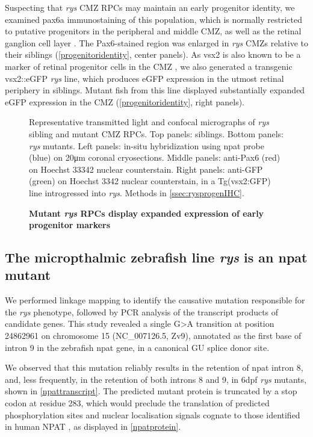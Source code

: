 Suspecting that \textit{rys} CMZ RPCs may maintain an early progenitor identity, we examined pax6a immunostaining of this population, which is normally restricted to putative progenitors in the peripheral and middle CMZ, as well as the retinal ganglion cell layer \cite{Raymond2006}. The Pax6-stained region was enlarged in \textit{rys} CMZs relative to their siblings (\autoref{progenitoridentity}, center panels). As vsx2 is also known to be a marker of retinal progenitor cells in the CMZ \cite{Raymond2006}, we also generated a transgenic vsx2::eGFP \textit{rys} line, which produces eGFP expression in the utmost retinal periphery in siblings. Mutant fish from this line displayed substantially expanded eGFP expression in the CMZ (\autoref{progenitoridentity}, right panels).

\begin{figure}[!h]
    \caption{{\bf Mutant \textit{rys} RPCs display expanded expression of early progenitor markers}}
    Representative transmitted light and confocal micrographs of \textit{rys} sibling and mutant CMZ RPCs. Top panels: siblings. Bottom panels: \textit{rys} mutants. Left panels: in-situ hybridization using npat probe (blue) on 20\si{\micro\metre} coronal cryosections. Middle panels: anti-Pax6 (red) on Hoechst 33342 nuclear counterstain. Right panels: anti-GFP (green) on Hoechst 3342 nuclear counterstain, in a Tg(vsx2:GFP) line introgressed into \textit{rys}. 
    Methods in \autoref{ssec:rysprogenIHC}.
    \label{progenitoridentity}
\end{figure}

\FloatBarrier
\subsection{The micropthalmic zebrafish line \textit{rys} is an npat mutant}

We performed linkage mapping to identify the causative mutation responsible for the \textit{rys} phenotype, followed by PCR analysis of the transcript products of candidate genes. This study revealed a single G\textgreater{}A transition at position 24862961 on chromosome 15 (NC\_007126.5, Zv9), annotated as the first base of intron 9 in the zebrafish npat gene, in a canonical GU splice donor site. 

We observed that this mutation reliably results in the retention of npat intron 8, and, less frequently, in the retention of both introns 8 and 9, in 6dpf \textit{rys} mutants, shown in \autoref{npattranscript}. The predicted mutant protein is truncated by a stop codon at residue 283, which would preclude the translation of predicted phosphorylation sites and nuclear localisation signals cognate to those identified in human NPAT \cite{Ma2000,Sagara2002}, as displayed in \autoref{npatprotein}.

